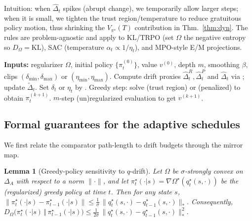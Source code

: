 \documentclass{article}
\theoremstyle{plain}
\newtheorem{lemma}[theorem]{Lemma}
\theoremstyle{definition}
\theoremstyle{remark}
\newcommand{\1}{\mathbbm{1}}
\newcommand{\KL}{\mathrm{KL}}
\begin{document}
\noindent
Intuition: when $\widehat{\Delta}_t$ spikes (abrupt change), we temporarily allow larger steps;
when it is small, we tighten the trust region/temperature to reduce gratuitous policy motion, thus
shrinking the $V_{\pi^\star}(T)$ contribution in Thm.~\ref{thm:dyn}. The rules are
problem-agnostic and apply to KL/TRPO (set $\Omega$ the negative entropy so $D_\Omega=\KL$),
SAC (temperature $\alpha_t\propto1/\eta_t$), and MPO-style E/M projections.

\begin{algorithm}[t]
\caption{NS--MD--MPI with Drift-Adaptive Trust Region / Temperature}
\label{alg:nsmdmpi-da}
\begin{algorithmic}[1]
\STATE \textbf{Inputs:} regularizer $\Omega$, initial policy $\{\pi^{(0)}_t\}$, value $v^{(0)}$, depth $m$, smoothing $\beta$, clips $(\delta_{\min},\delta_{\max})$ or $(\eta_{\min},\eta_{\max})$.
    \STATE Compute drift proxies $\widehat{\Delta}^R_t,\widehat{\Delta}^P_t$ and $\widehat{\Delta}_t$ via ; update $\widetilde{\Delta}_t$.
    \STATE Set $\delta_t$ or $\eta_t$ by .
    \STATE Greedy step: solve  (trust region) or  (penalized) to obtain $\pi^{(k+1)}_t$.
  \ENDFOR
  \STATE $m$-step (un)regularized evaluation to get $v^{(k+1)}$.
\ENDFOR
\end{algorithmic}
\end{algorithm}

\subsection{Formal guarantees for the adaptive schedules}
We first relate the comparator path-length to drift budgets through the mirror map.

\begin{lemma}[Greedy-policy sensitivity to $q$-drift]
\label{lem:sensitivity}
Let $\Omega$ be $\sigma$-strongly convex on $\Delta_A$ with respect to a norm $\|\cdot\|$, and let
$\pi^\star_t(\cdot|s)=\nabla\Omega^\star(q^\star_t(s,\cdot))$ be the (regularized) greedy policy at time $t$.
Then for any state $s$,
\(
\|\pi^\star_t(\cdot|s)-\pi^\star_{t-1}(\cdot|s)\|
\le \tfrac{1}{\sigma}\,\|q^\star_t(s,\cdot)-q^\star_{t-1}(s,\cdot)\|_*.
\)
Consequently,
\(
D_\Omega\!\big(\pi^\star_t(\cdot|s)\,\Vert\,\pi^\star_{t-1}(\cdot|s)\big)
\le \tfrac{1}{2\sigma}\,\|q^\star_t(s,\cdot)-q^\star_{t-1}(s,\cdot)\|_*^2.
\)
\end{lemma}
\end{document}
